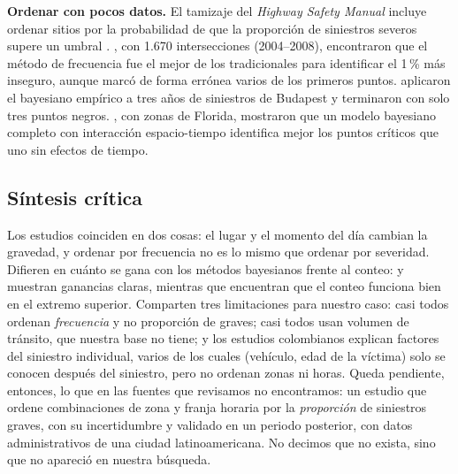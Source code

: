 \documentclass[10pt,twocolumn]{article}
\begin{document}
\textbf{Ordenar con pocos datos.} El tamizaje del \emph{Highway Safety Manual} incluye ordenar sitios por la probabilidad de que la proporción de siniestros severos supere un umbral \citep{fhwa2014hsm,fhwascreening}. \citet{lim2013identifying}, con 1.670 intersecciones (2004--2008), encontraron que el método de frecuencia fue el mejor de los tradicionales para identificar el 1\,\% más inseguro, aunque marcó de forma errónea varios de los primeros puntos. \citet{mekonnen2023identifying} aplicaron el bayesiano empírico a tres años de siniestros de Budapest y terminaron con solo tres puntos negros. \citet{dong2016macroscopic}, con zonas de Florida, mostraron que un modelo bayesiano completo con interacción espacio-tiempo identifica mejor los puntos críticos que uno sin efectos de tiempo.

\subsection{Síntesis crítica}
Los estudios coinciden en dos cosas: el lugar y el momento del día cambian la gravedad, y ordenar por frecuencia no es lo mismo que ordenar por severidad. Difieren en cuánto se gana con los métodos bayesianos frente al conteo: \citet{dong2016macroscopic} y \citet{mekonnen2023identifying} muestran ganancias claras, mientras que \citet{lim2013identifying} encuentran que el conteo funciona bien en el extremo superior. Comparten tres limitaciones para nuestro caso: casi todos ordenan \emph{frecuencia} y no proporción de graves; casi todos usan volumen de tránsito, que nuestra base no tiene; y los estudios colombianos explican factores del siniestro individual, varios de los cuales (vehículo, edad de la víctima) solo se conocen después del siniestro, pero no ordenan zonas ni horas. Queda pendiente, entonces, lo que en las fuentes que revisamos no encontramos: un estudio que ordene combinaciones de zona y franja horaria por la \emph{proporción} de siniestros graves, con su incertidumbre y validado en un periodo posterior, con datos administrativos de una ciudad latinoamericana. No decimos que no exista, sino que no apareció en nuestra búsqueda.
\end{document}
